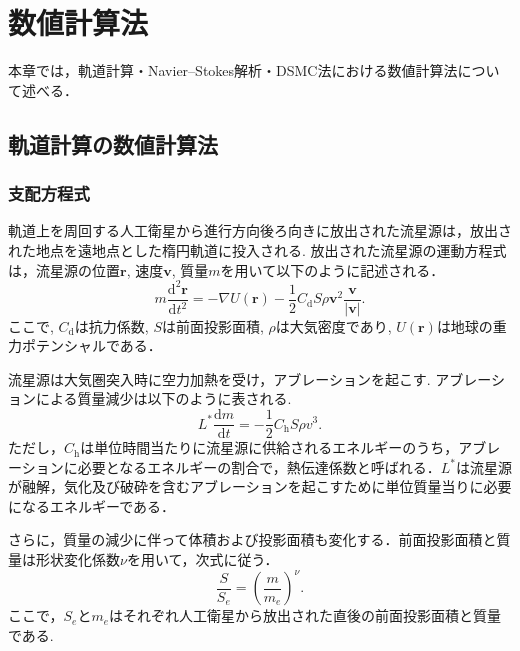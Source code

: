 \chapter{数値計算法}
\label{chap:methods}
本章では，軌道計算・Navier–Stokes解析・DSMC法における数値計算法について述べる．


\section{軌道計算の数値計算法}
\subsection{支配方程式}
軌道上を周回する人工衛星から進行方向後ろ向きに放出された流星源は，放出された地点を遠地点とした楕円軌道に投入される. 放出された流星源の運動方程式は，流星源の位置$\bm{r}$, 速度$\bm{v}$, 質量$m$を用いて以下のように記述される．
\begin{equation}
    \label{eq:equation-of-motion}
    m\dfrac{\mathrm{d}^2\bm{r}}{\mathrm{d}t^2} = -\nabla U(\bm{r}) - \dfrac{1}{2}C_\mathrm{d} S \rho \bm{v}^2\dfrac{\bm{v}}{|\bm{v}|}.
\end{equation}
ここで, $C_\mathrm{d}$は抗力係数, $S$は前面投影面積, $\rho$は大気密度であり, $U(\bm{r})$は地球の重力ポテンシャルである．

流星源は大気圏突入時に空力加熱を受け，アブレーションを起こす. アブレーションによる質量減少は以下のように表される.
\begin{equation}
    \label{eq:mass-by-ablation}
    L^*\dfrac{\mathrm{d}m}{\mathrm{d}t} = -\dfrac12C_\mathrm{h}S\rho v^3.
\end{equation}
 ただし，$C_\mathrm{h}$は単位時間当たりに流星源に供給されるエネルギーのうち，アブレーションに必要となるエネルギーの割合で，熱伝達係数と呼ばれる．$L^*$は流星源が融解，気化及び破砕を含むアブレーションを起こすために単位質量当りに必要になるエネルギーである．
 
さらに，質量の減少に伴って体積および投影面積も変化する．前面投影面積と質量は形状変化係数$\nu$を用いて，次式に従う．
\begin{equation}
    \label{eq:area-mass}
    \dfrac{S}{S_e} = \left(\dfrac{m}{m_e}\right)^\nu.
\end{equation}
ここで，$S_e$と$m_e$はそれぞれ人工衛星から放出された直後の前面投影面積と質量である.


